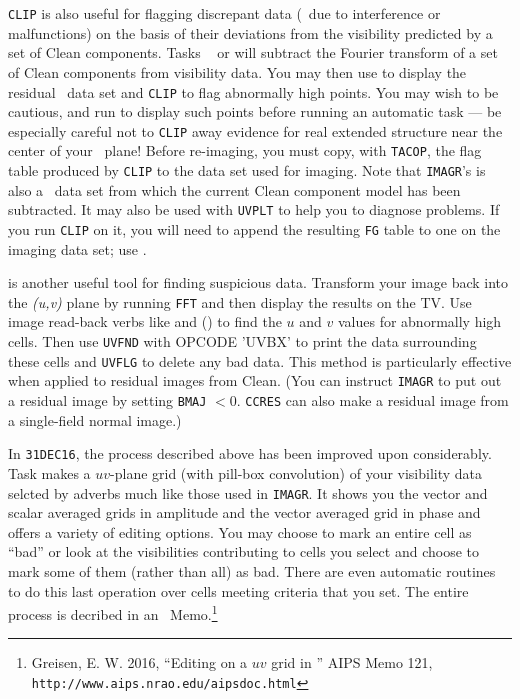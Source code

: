      {\tt CLIP} is also useful for flagging discrepant data (\eg\ due
to interference or malfunctions) on the basis of their deviations from
the visibility predicted by a set of Clean components.  Tasks {\tt
{}} or {\tt {}} will subtract the Fourier
transform of a set of Clean components from visibility data.  You may
then use {\tt {}} to display the residual \uv\ data set and
{\tt CLIP} to flag abnormally high points.  You may wish to be
cautious, and run {\tt {}} to display such points before
running an automatic {\tt {}} task --- be especially careful
not to {\tt CLIP} away evidence for real extended structure near the
center of your \uv\ plane!  Before re-imaging, you must copy, with
{\tt TACOP}, the flag table produced by {\tt CLIP} to the data set
used for imaging.  Note that {\tt IMAGR}'s  is also a
\uv\ data set from which the current Clean component model has been
subtracted.  It may also be used with {\tt UVPLT} to help you to
diagnose problems.  If you run {\tt CLIP} on it, you will need to
append the resulting {\tt FG} table to one on the imaging data set;
use {\tt {}}\@.

     {\tt {}} is another useful tool for finding suspicious
data. Transform your image back into the {\it (u,v)\/} plane by running
{\tt FFT} and then display the results on the TV\@.  Use image
read-back verbs like {\tt {}} and {\tt {}}
() to find the $u$ and $v$ values for abnormally high
cells.  Then use {\tt UVFND} with {\us OPCODE 'UVBX'} to print the
data surrounding these cells and {\tt UVFLG} to delete any bad data.
This method is particularly effective when applied to residual images
from Clean.  (You can instruct {\tt IMAGR} to put out a residual image
by setting {\tt BMAJ} $<$0.  {\tt CCRES} can also make a residual
image from a single-field normal image.)

     In {\tt 31DEC16}, the process described above has been improved
upon considerably.  Task {\tt {}} makes a $uv$-plane grid
(with pill-box convolution) of your visibility data selcted by adverbs
much like those used in {\tt IMAGR}\@.  It shows you the vector and
scalar averaged grids in amplitude and the vector averaged grid in
phase and offers a variety of editing options.  You may choose to mark
an entire cell as ``bad'' or look at the visibilities contributing to
cells you select and choose to mark some of them (rather than all) as
bad.  There are even automatic routines to do this last operation over
cells meeting criteria that you set.  The entire process is decribed
in an \AIPS\ Memo.\footnote{Greisen, E. W. 2016, ``Editing on a $uv$
grid in \AIPS'' AIPS Memo 121, {\tt
http://www.aips.nrao.edu/aipsdoc.html}}

